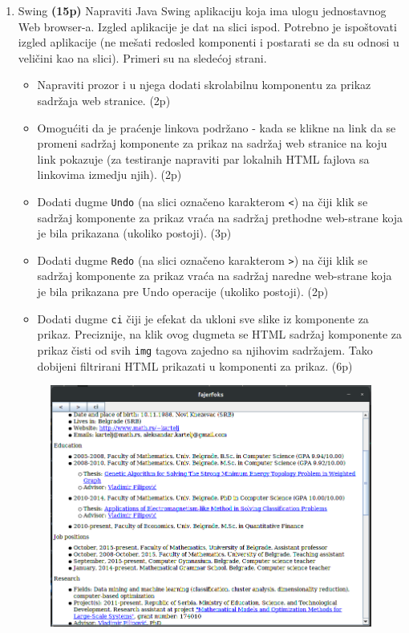 \documentclass[]{article}
\begin{document}
\begin{enumerate}
  \item Swing \textbf{(15p)}
  Napraviti Java Swing aplikaciju koja ima ulogu jednostavnog Web browser-a. Izgled aplikacije je dat na slici ispod. Potrebno je ispo\v{s}tovati izgled aplikacije (ne me\v{s}ati redosled komponenti i postarati se da su odnosi u veli\v{c}ini kao na slici). Primeri su na slede\'c{}oj strani.
  \begin{itemize}
    \item Napraviti prozor i u njega dodati skrolabilnu komponentu za prikaz sadr\v{z}aja web stranice. \hfill (2p)
    \item Omogu\'c{}iti da je pra\'c{}enje linkova podr\v{z}ano - kada se klikne na link da se promeni sadr\v{z}aj komponente za prikaz na sadr\v{z}aj web stranice na koju link pokazuje (za testiranje napraviti par lokalnih HTML fajlova sa linkovima izmedju njih). \hfill (2p)
    \item Dodati dugme \texttt{Undo} (na slici ozna\v{c}eno karakterom \texttt{<}) na \v{c}iji klik se sadr\v{z}aj komponente za prikaz vra\'c{}a na sadr\v{z}aj prethodne web-strane koja je bila prikazana (ukoliko postoji). \hfill (3p)
    \item Dodati dugme \texttt{Redo} (na slici ozna\v{c}eno karakterom \texttt{>}) na \v{c}iji klik se sadr\v{z}aj komponente za prikaz vra\'c{}a na sadr\v{z}aj naredne web-strane koja je bila prikazana pre Undo operacije (ukoliko postoji). \hfill (2p)
    \item Dodati dugme \texttt{ci} \v{c}iji je efekat da ukloni sve slike iz komponente za prikaz. Preciznije, na klik ovog dugmeta se HTML sadr\v{z}aj komponente za prikaz \v{c}isti od svih \texttt{img} tagova zajedno sa njihovim sadr\v{z}ajem. Tako dobijeni filtrirani HTML prikazati u komponenti za prikaz. \hfill (6p)
  \end{itemize}

  \begin{figure}[H]
    \centering
    \includegraphics[scale=0.5]{fig2.PNG}
    \label{fig2}
  \end{figure}

\end{enumerate}
\end{document}
